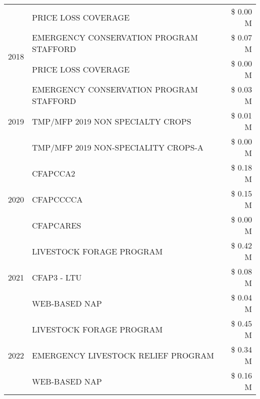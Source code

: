 \begin{tabular}{llr}
 & PRICE LOSS COVERAGE & \$ 0.00 M \\
\cline{1-3}
\multirow[t]{2}{*}{2018} & EMERGENCY CONSERVATION PROGRAM STAFFORD & \$ 0.07 M \\
 & PRICE LOSS COVERAGE & \$ 0.00 M \\
\cline{1-3}
\multirow[t]{3}{*}{2019} & EMERGENCY CONSERVATION PROGRAM STAFFORD & \$ 0.03 M \\
 & TMP/MFP 2019 NON SPECIALTY CROPS & \$ 0.01 M \\
 & TMP/MFP 2019 NON-SPECIALITY CROPS-A & \$ 0.00 M \\
\cline{1-3}
\multirow[t]{3}{*}{2020} & CFAPCCA2 & \$ 0.18 M \\
 & CFAPCCCCA & \$ 0.15 M \\
 & CFAPCARES & \$ 0.00 M \\
\cline{1-3}
\multirow[t]{3}{*}{2021} & LIVESTOCK FORAGE PROGRAM & \$ 0.42 M \\
 & CFAP3 - LTU & \$ 0.08 M \\
 & WEB-BASED NAP & \$ 0.04 M \\
\cline{1-3}
\multirow[t]{3}{*}{2022} & LIVESTOCK FORAGE PROGRAM & \$ 0.45 M \\
 & EMERGENCY LIVESTOCK RELIEF PROGRAM & \$ 0.34 M \\
 & WEB-BASED NAP & \$ 0.16 M \\
\cline{1-3}
\bottomrule
\end{tabular}
